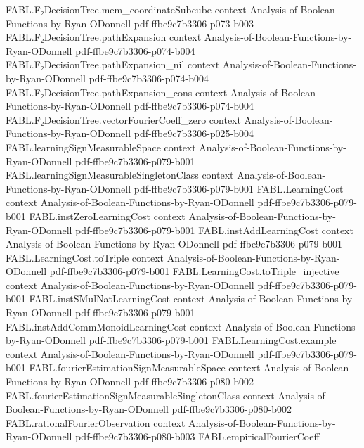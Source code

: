\begin{theorem}
  {FABL.F₂DecisionTree.mem_coordinateSubcube}
  {context}
  {Analysis-of-Boolean-Functions-by-Ryan-ODonnell}
  {pdf-ffbe9c7b3306-p073-b003}
\proofstep
  {FABL.F₂DecisionTree.pathExpansion}
  {context}
  {Analysis-of-Boolean-Functions-by-Ryan-ODonnell}
  {pdf-ffbe9c7b3306-p074-b004}
\proofstep
  {FABL.F₂DecisionTree.pathExpansion_nil}
  {context}
  {Analysis-of-Boolean-Functions-by-Ryan-ODonnell}
  {pdf-ffbe9c7b3306-p074-b004}
\proofstep
  {FABL.F₂DecisionTree.pathExpansion_cons}
  {context}
  {Analysis-of-Boolean-Functions-by-Ryan-ODonnell}
  {pdf-ffbe9c7b3306-p074-b004}
\proofstep
  {FABL.F₂DecisionTree.vectorFourierCoeff_zero}
  {context}
  {Analysis-of-Boolean-Functions-by-Ryan-ODonnell}
  {pdf-ffbe9c7b3306-p025-b004}
\proofstep
  {FABL.learningSignMeasurableSpace}
  {context}
  {Analysis-of-Boolean-Functions-by-Ryan-ODonnell}
  {pdf-ffbe9c7b3306-p079-b001}
\proofstep
  {FABL.learningSignMeasurableSingletonClass}
  {context}
  {Analysis-of-Boolean-Functions-by-Ryan-ODonnell}
  {pdf-ffbe9c7b3306-p079-b001}
\proofstep
  {FABL.LearningCost}
  {context}
  {Analysis-of-Boolean-Functions-by-Ryan-ODonnell}
  {pdf-ffbe9c7b3306-p079-b001}
\proofstep
  {FABL.instZeroLearningCost}
  {context}
  {Analysis-of-Boolean-Functions-by-Ryan-ODonnell}
  {pdf-ffbe9c7b3306-p079-b001}
\proofstep
  {FABL.instAddLearningCost}
  {context}
  {Analysis-of-Boolean-Functions-by-Ryan-ODonnell}
  {pdf-ffbe9c7b3306-p079-b001}
\proofstep
  {FABL.LearningCost.toTriple}
  {context}
  {Analysis-of-Boolean-Functions-by-Ryan-ODonnell}
  {pdf-ffbe9c7b3306-p079-b001}
\proofstep
  {FABL.LearningCost.toTriple_injective}
  {context}
  {Analysis-of-Boolean-Functions-by-Ryan-ODonnell}
  {pdf-ffbe9c7b3306-p079-b001}
\proofstep
  {FABL.instSMulNatLearningCost}
  {context}
  {Analysis-of-Boolean-Functions-by-Ryan-ODonnell}
  {pdf-ffbe9c7b3306-p079-b001}
\proofstep
  {FABL.instAddCommMonoidLearningCost}
  {context}
  {Analysis-of-Boolean-Functions-by-Ryan-ODonnell}
  {pdf-ffbe9c7b3306-p079-b001}
\proofstep
  {FABL.LearningCost.example}
  {context}
  {Analysis-of-Boolean-Functions-by-Ryan-ODonnell}
  {pdf-ffbe9c7b3306-p079-b001}
\proofstep
  {FABL.fourierEstimationSignMeasurableSpace}
  {context}
  {Analysis-of-Boolean-Functions-by-Ryan-ODonnell}
  {pdf-ffbe9c7b3306-p080-b002}
\proofstep
  {FABL.fourierEstimationSignMeasurableSingletonClass}
  {context}
  {Analysis-of-Boolean-Functions-by-Ryan-ODonnell}
  {pdf-ffbe9c7b3306-p080-b002}
\proofstep
  {FABL.rationalFourierObservation}
  {context}
  {Analysis-of-Boolean-Functions-by-Ryan-ODonnell}
  {pdf-ffbe9c7b3306-p080-b003}
\proofstep
  {FABL.empiricalFourierCoeff}

\end{theorem}
